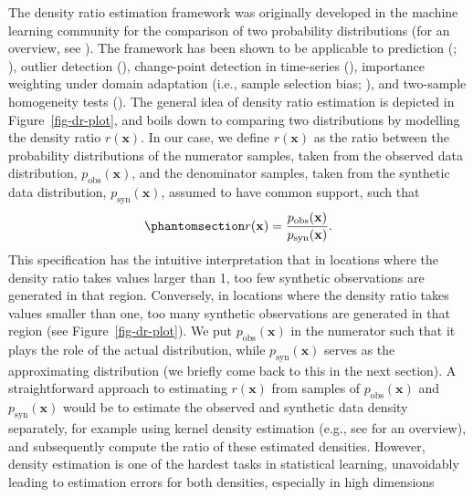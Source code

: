 \documentclass[
]{article}
\newcommand{\pobs}{p_{\text{obs}}}
\newcommand{\psyn}{p_{\text{syn}}}
\newcommand{\bx}{\mathbf{x}}
\begin{document}
The density ratio estimation framework was originally developed in the
machine learning community for the comparison of two probability
distributions (for an overview, see
). The framework has been shown to be applicable to
prediction (; ),
outlier detection (), change-point detection in time-series
(), importance weighting
under domain adaptation (i.e., sample selection bias;
),
and two-sample homogeneity tests
(). The
general idea of density ratio estimation is depicted in
Figure~\ref{fig-dr-plot}, and boils down to comparing two distributions
by modelling the density ratio \(r(\bx)\). In our case, we define
\(r(\bx)\) as the ratio between the probability distributions of the
numerator samples, taken from the observed data distribution,
\(\pobs(\bx)\), and the denominator samples, taken from the synthetic
data distribution, \(\psyn(\bx)\), assumed to have common support, such
that \begin{equation}\phantomsection\label{eq-dr}{
r(\bx) = \frac{\pobs(\bx)}{\psyn(\bx)}.
}\end{equation} This specification has the intuitive interpretation that
in locations where the density ratio takes values larger than 1, too few
synthetic observations are generated in that region. Conversely, in
locations where the density ratio takes values smaller than one, too
many synthetic observations are generated in that region (see
Figure~\ref{fig-dr-plot}). We put \(\pobs(\bx)\) in the numerator such
that it plays the role of the actual distribution, while \(\psyn(\bx)\)
serves as the approximating distribution (we briefly come back to this
in the next section). A straightforward approach to estimating
\(r(\bx)\) from samples of \(\pobs(\bx)\) and \(\psyn(\bx)\) would be to
estimate the observed and synthetic data density separately, for example
using kernel density estimation (e.g., see
 for an overview), and subsequently
compute the ratio of these estimated densities. However, density
estimation is one of the hardest tasks in statistical learning,
unavoidably leading to estimation errors for both densities, especially
in high dimensions
\end{document}
